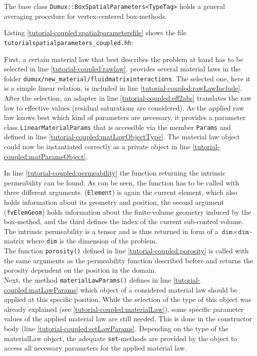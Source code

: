 The base class \texttt{Dumux::BoxSpatialParameters<TypeTag>} holds a general 
averaging procedure for vertex-centered box-methods.

Listing \ref{tutorial-coupled:spatialparametersfile} shows the file
\verb+tutorialspatialparameters_coupled.hh+:

\begin{lst}\label{tutorial-coupled:spatialparametersfile} \mbox{}

\end{lst}

First, a certain material law that best describes the problem at hand has to
be selected in line \ref{tutorial-coupled:rawlaw}\label{tutorial-coupled:materialLaw}. 
\Dumux provides several material laws in the folder 
\verb+dumux/new_material/fluidmatrixinteractions+.
The selected one, here it is a simple linear relation, is included
in line \ref{tutorial-coupled:rawLawInclude}. After the selection,
an adapter in line \ref{tutorial-coupled:eff2abs} translates the raw 
law to effective values (residual saturations are considered). As the
applied raw law knows best which kind of parameters are necessary,
it provides a parameter class \texttt{LinearMaterialParams} that is
accessible via the member \texttt{Params} and defined in line 
\ref{tutorial-coupled:matLawObjectType}. The material law object 
could now be instantiated correctly as a private object
in line \ref{tutorial-coupled:matParamsObject}.

In line \ref{tutorial-coupled:permeability} the function returning the
intrinsic permeability can be found. As can be seen, the function has
to be called with three different arguments. 
(\texttt{Element}) is again the current element, which also holds information
about its geometry and position, the second argument
(\texttt{fvElemGeom}) holds information about the finite-volume geometry induced
by the box-method, and the third defines the index of the current sub-control 
volume. The intrinsic permeability is a tensor and is thus returned in form of
a $\texttt{dim} \times \texttt{dim}$-matrix where \texttt{dim} is the dimension 
of the problem.\\
The function \texttt{porosity()} defined in line
\ref{tutorial-coupled:porosity} is called with the same arguments as
the permeability function described before and returns the porosity
dependent on the position in the domain.\\
Next, the method \texttt{materialLawParams()} defines in line 
\ref{tutorial-coupled:matLawParams} which object of a considered 
material law should be applied at this specific position. 
While the selection of the type of this object was already explained (see 
\ref{tutorial-coupled:materialLaw}), some specific parameter 
values of the applied material law are still needed. This is 
done in the constructor body (line \ref{tutorial-coupled:setLawParams}.
Depending on the type of the materialLaw object, the adequate \texttt{set}-methods
are provided by the object to access all necessary parameters 
for the applied material law.

